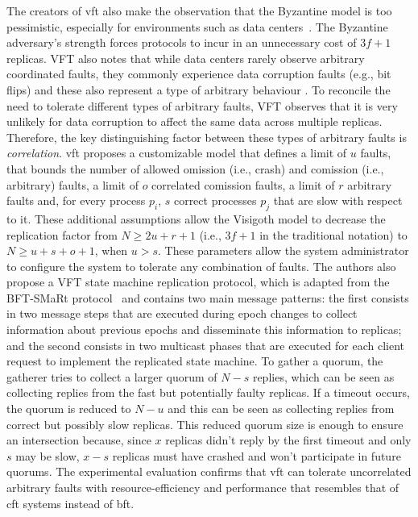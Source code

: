 The creators of \acrfull{vft} also make the observation that the Byzantine model is too pessimistic, especially for environments such as data centers~\cite{Porto2015}. The Byzantine adversary's strength forces protocols to incur in an unnecessary cost of $3f+1$ replicas. VFT also notes that while data centers rarely observe arbitrary coordinated faults, they commonly experience data corruption faults (e.g., bit flips) and these also represent a type of arbitrary behaviour \cite{AmazonS31,AmazonS32}. To reconcile the need to tolerate different types of arbitrary faults, VFT observes that it is very unlikely for data corruption to affect the same data across multiple replicas. Therefore, the key distinguishing factor between these types of arbitrary faults is \textit{correlation}. \acrshort{vft} proposes a customizable model that defines a limit of $u$ faults, that bounds the number of allowed omission (i.e., crash) and comission (i.e., arbitrary) faults, a limit of $o$ correlated comission faults, a limit of $r$ arbitrary faults and, for every process $p_i$, $s$ correct processes $p_j$ that are slow with respect to it. These additional assumptions allow the Visigoth model to decrease the replication factor from $N \geq 2u+r+1$ (i.e., $3f+1$ in the traditional notation) to $N \geq u+s+o+1$, when $u > s$. These parameters allow the system administrator to configure the system to tolerate any combination of faults. The authors also propose a VFT state machine replication protocol, which is adapted from the BFT-SMaRt protocol~\cite{Bessani:2014} and contains two main message patterns: the first consists in two message steps that are executed during epoch changes to collect information about previous epochs and disseminate this information to replicas; and the second consists in two multicast phases that are executed for each client request to implement the replicated state machine. To gather a quorum, the gatherer tries to collect a larger quorum of $N-s$ replies, which can be seen as collecting replies from the fast but potentially faulty replicas. If a timeout occurs, the quorum is reduced to $N-u$ and this can be seen as collecting replies from correct but possibly slow replicas. This reduced quorum size is enough to ensure an intersection because, since $x$ replicas didn't reply by the first timeout and only $s$ may be slow, $x-s$ replicas must have crashed and won't participate in future quorums. The experimental evaluation confirms that \acrshort{vft} can tolerate uncorrelated arbitrary faults with resource-efficiency and performance that resembles that of \acrshort{cft} systems instead of \acrshort{bft}. \par
